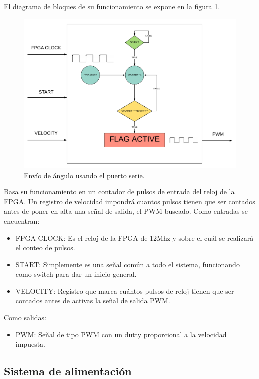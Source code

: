El diagrama de bloques de su funcionamiento se expone en la figura \ref{fig:pwm_control}.

\begin{figure}[H]
	\center
	\includegraphics[trim = 0mm 0mm 0mm 0mm, clip,scale=0.6]{imagenes/Balancing_robot/pwm_control.pdf}
	\caption{Envío de ángulo usando el puerto serie.}
	\label{fig:pwm_control}
\end{figure}

Basa su funcionamiento en un contador de pulsos de entrada del reloj de la FPGA. Un registro de velocidad impondrá cuantos pulsos tienen que ser contados antes de poner en alta una señal de salida, el PWM buscado. \newline
Como entradas se encuentran: 
\begin{itemize}
	\item FPGA CLOCK: Es el reloj de la FPGA de 12Mhz y sobre el cuál se realizará el conteo de pulsos.
	\item START: Simplemente es una señal común a todo el sistema, funcionando como switch para dar un inicio general.
	\item VELOCITY: Registro que marca cuántos pulsos de reloj tienen que ser contados antes de activas la señal de salida PWM.
\end{itemize}

Como salidas:
\begin{itemize}
	\item PWM: Señal de tipo PWM con un dutty proporcional a la velocidad impuesta.
\end{itemize}



\subsection{Sistema de alimentación}


